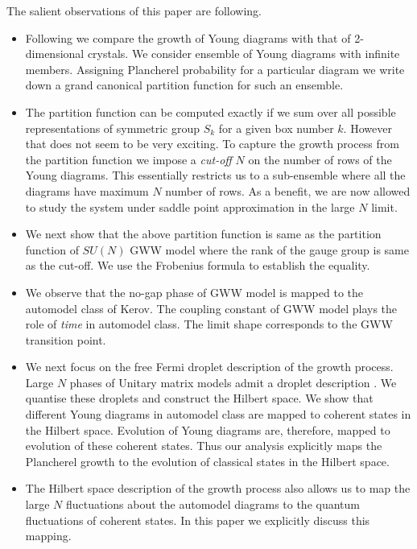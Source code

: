 \documentclass[final,3p,12pt,times]{elsarticle}
\numberwithin{equation}{section}
\begin{document}
The salient observations of this paper are following.
\begin{itemize}
    \item Following \cite{Eynard:2008mt} we compare the growth of Young diagrams with that of 2-dimensional crystals. We consider ensemble of Young diagrams with infinite members. Assigning Plancherel probability for a particular diagram we write down a grand canonical partition function for such an ensemble.
    \item The partition function can be computed exactly if we sum over all possible representations of symmetric group $S_k$ for a given box number $k$. However that does not seem to be very exciting. To capture the growth process from the partition function we impose a \emph{cut-off} $N$ on the number of rows of the Young diagrams. This essentially restricts us to a sub-ensemble where all the diagrams have maximum $N$ number of rows. As a benefit, we are now allowed to study the system under saddle point approximation in the large $N$ limit.
    \item We next show that the above partition function is same as the partition function of $SU(N)$ GWW model where the rank of the gauge group is same as the cut-off. We use the Frobenius formula to establish the equality.
    \item We observe that the no-gap phase of GWW model is mapped to the automodel class of Kerov. The coupling constant of GWW model plays the role of \emph{time} in automodel class. The limit shape corresponds to the GWW transition point. 
    \item We next focus on the free Fermi droplet description of the growth process. Large $N$ phases of Unitary matrix models admit a droplet description \cite{duttagopakumar}. We quantise these droplets and construct the Hilbert space. We show that different Young diagrams in automodel class are mapped to coherent states in the Hilbert space. Evolution of Young diagrams are, therefore, mapped to evolution of these coherent states. Thus our analysis explicitly maps the Plancherel growth to the evolution of classical states in the Hilbert space.
    \item The Hilbert space description of the growth process also allows us to map the large $N$ fluctuations about the automodel diagrams to the quantum fluctuations of coherent states. In this paper we explicitly discuss this mapping.
    
\end{itemize}
\end{document}
